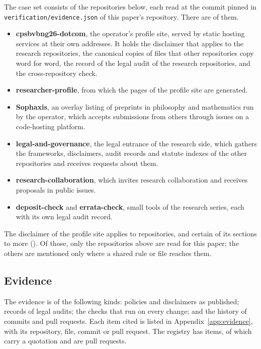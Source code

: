 \documentclass[11pt]{article}
\newcommand{\ev}[1]{\directlua{ev("\luaescapestring{#1}")}}
\newcommand{\citeev}[1]{(\ev{#1})}
\begin{document}
The case set consists of the repositories below, each read at the commit pinned in \texttt{verification/evidence.json} of this paper's repository. There are \nEvRepos{} of them.

\begin{itemize}
\item \textbf{cpsbvbng26-dotcom}, the operator's profile site, served by static hosting services at their own addresses. It holds the disclaimer that applies to the research repositories, the canonical copies of files that other repositories copy word for word, the record of the legal audit of the research repositories, and the cross-repository check.
\item \textbf{researcher-profile}, from which the pages of the profile site are generated.
\item \textbf{Sophaxis}, an overlay listing of preprints in philosophy and mathematics run by the operator, which accepts submissions from others through issues on a code-hosting platform.
\item \textbf{legal-and-governance}, the legal entrance of the research side, which gathers the frameworks, disclaimers, audit records and statute indexes of the other repositories and receives requests about them.
\item \textbf{research-collaboration}, which invites research collaboration and receives proposals in public issues.
\item \textbf{deposit-check} and \textbf{errata-check}, small tools of the research series, each with its own legal audit record.
\end{itemize}

The disclaimer of the profile site applies to \nDiscTen{} repositories, and certain of its sections to \nDiscExtra{} more \citeev{disc-contract}. Of those, only the repositories above are read for this paper; the others are mentioned only where a shared rule or file reaches them.

\subsection{Evidence}

The evidence is of the following kinds: policies and disclaimers as published; records of legal audits; the checks that run on every change; and the history of commits and pull requests. Each item cited is listed in Appendix~\ref{app:evidence}, with its repository, file, commit or pull request. The registry has \nEvItems{} items, of which \nEvQuotes{} carry a quotation and \nEvPRs{} are pull requests.
\end{document}
